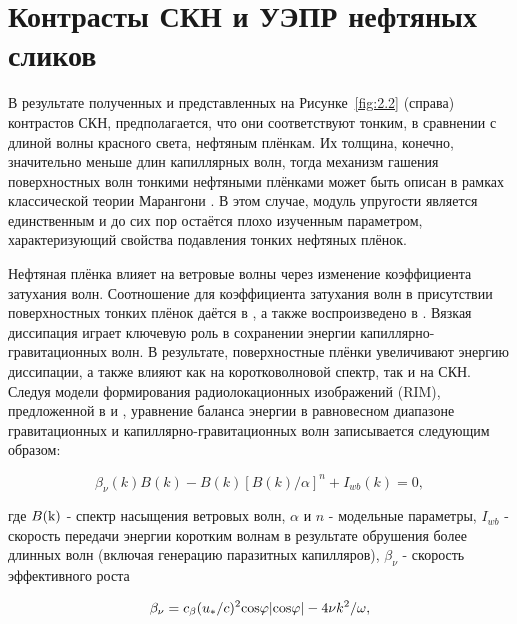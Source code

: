 \section{Контрасты СКН и УЭПР нефтяных сликов} \label{sec:2.3}


В результате полученных и представленных на Рисунке~\ref{fig:2.2} (справа) контрастов СКН, предполагается, что они соответствуют тонким, в сравнении с длиной волны красного света, нефтяным плёнкам. Их толщина, конечно, значительно меньше длин капиллярных волн, тогда механизм гашения поверхностных волн тонкими нефтяными плёнками может быть описан в рамках классической теории Марангони \citep{Levich1962}. В этом случае, модуль упругости является единственным и до сих пор остаётся плохо изученным параметром, характеризующий свойства подавления тонких нефтяных плёнок.

Нефтяная плёнка влияет на ветровые волны через изменение коэффициента затухания волн. Соотношение для коэффициента затухания волн в присутствии поверхностных тонких плёнок даётся в \citep{Levich1962}, а также воспроизведено в \citep{Kudryavtsev2005}. Вязкая диссипация играет ключевую роль в сохранении энергии капиллярно-гравитационных волн. В результате, поверхностные плёнки увеличивают энергию диссипации, а также влияют как на коротковолновой спектр, так и на СКН. Следуя модели формирования радиолокационных изображений (RIM), предложенной в \citep{Kudryavtsev2005} и \citep{Johannessen2005}, уравнение баланса энергии в равновесном диапазоне гравитационных и капиллярно-гравитационных волн записывается следующим образом:


\begin{equation} \label{eq:2.1}
\beta_{\nu }(k) B(k) - B(k) \left[ B(k) / \alpha \right]^n + I_{wb}(k) = 0 ,
\end{equation}


\noindent где $B({\rm k})$ - спектр насыщения ветровых волн, $\alpha $ и $n$ - модельные параметры, $I_{wb}^{} $ - скорость передачи энергии коротким волнам в результате обрушения более длинных волн (включая генерацию паразитных капилляров), $\beta_{\nu } $ - скорость эффективного роста



\begin{equation} \label{eq:2.2} 
\beta _{\nu } =c_{\beta } (u_{{\rm *}} /c)^{2} {\rm cos}\varphi |{\rm cos}\varphi |-4\nu k^{2} /\omega ,
\end{equation}


